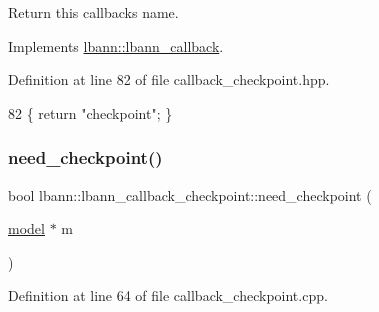 Return this callback\textquotesingle{}s name. 

Implements \hyperlink{classlbann_1_1lbann__callback_a7522c7a14f1d6a1ea762cc2d7248eb3a}{lbann\+::lbann\+\_\+callback}.



Definition at line 82 of file callback\+\_\+checkpoint.\+hpp.


\begin{DoxyCode}
82 \{ \textcolor{keywordflow}{return} \textcolor{stringliteral}{"checkpoint"}; \}
\end{DoxyCode}
\mbox{\label{classlbann_1_1lbann__callback__checkpoint_a2e5f396667ccc45f7203263b06c5e216}} 
\subsubsection{\texorpdfstring{need\+\_\+checkpoint()}{need\_checkpoint()}}
{\footnotesize\ttfamily bool lbann\+::lbann\+\_\+callback\+\_\+checkpoint\+::need\+\_\+checkpoint (\begin{DoxyParamCaption}\item[{\hyperlink{classlbann_1_1model}{model} $\ast$}]{m }\end{DoxyParamCaption})}



Definition at line 64 of file callback\+\_\+checkpoint.\+cpp.


